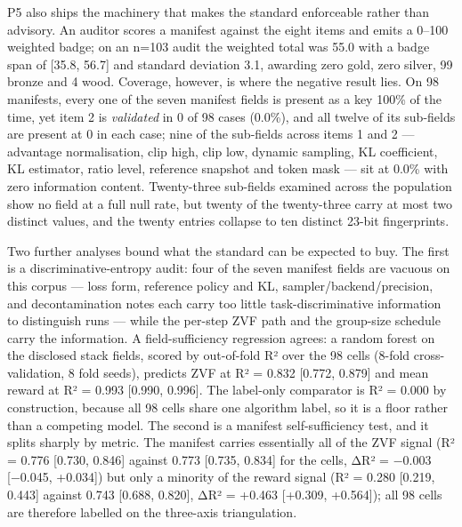 \documentclass[12pt,a4paper]{report}
\DeclareRobustCommand{\longtok}[1]{\texttt{\seqsplit{#1}}}
\begin{document}
P5 also ships the machinery that makes the standard enforceable rather
than advisory. An auditor scores a manifest against the eight items and
emits a 0--100 weighted badge; on an n=103 audit the weighted total was
55.0 with a badge span of {[}35.8, 56.7{]} and standard deviation 3.1,
awarding zero gold, zero silver, 99 bronze and 4 wood. Coverage,
however, is where the negative result lies. On 98 manifests, every one
of the seven manifest fields is present as a key 100\% of the time, yet
item 2 is \emph{validated} in 0 of 98 cases (0.0\%), and all twelve of
its sub-fields are present at 0 in each case; nine of the sub-fields
across items 1 and 2 --- advantage normalisation, clip high, clip low,
dynamic sampling, KL coefficient, KL estimator, ratio level, reference
snapshot and token mask --- sit at 0.0\% with zero information content.
Twenty-three sub-fields examined across the population show no field at
a full null rate, but twenty of the twenty-three carry at most two
distinct values, and the twenty entries collapse to ten distinct 23-bit
fingerprints.

Two further analyses bound what the standard can be expected to buy. The
first is a discriminative-entropy audit: four of the seven manifest
fields are vacuous on this corpus --- loss form, reference policy and
KL, sampler/backend/precision, and decontamination notes each carry too
little task-discriminative information to distinguish runs --- while the
per-step ZVF path and the group-size schedule carry the information. A
field-sufficiency regression agrees: a random forest on the disclosed
stack fields, scored by out-of-fold R² over the 98 cells (8-fold
cross-validation, 8 fold seeds), predicts ZVF at R² = 0.832 {[}0.772,
0.879{]} and mean reward at R² = 0.993 {[}0.990, 0.996{]}. The
label-only comparator is R² = 0.000 by construction, because all 98
cells share one algorithm label, so it is a floor rather than a
competing model. The second is a manifest self-sufficiency test, and it
splits sharply by metric. The manifest carries essentially all of the
ZVF signal (R² = 0.776 {[}0.730, 0.846{]} against 0.773 {[}0.735,
0.834{]} for the cells, ΔR² = −0.003 {[}−0.045, +0.034{]}) but only a
minority of the reward signal (R² = 0.280 {[}0.219, 0.443{]} against
0.743 {[}0.688, 0.820{]}, ΔR² = +0.463 {[}+0.309, +0.564{]}); all 98
cells are therefore labelled \longtok{honest\_\allowbreak{}but\_\allowbreak{}vacuous} on the
three-axis triangulation.
\end{document}
